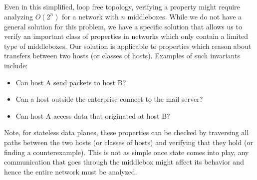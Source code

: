 {Even in this simplified, loop free topology, verifying a property might require analyzing $O(2^n)$ for a network with $n$ middleboxes.
While we do not have a general solution for this problem, we have a specific solution that allows us to verify an important class of properties in networks which
only contain a limited type of middleboxes.
Our solution is applicable to properties which reason about transfers between two hosts (or classes of hosts). Examples of such invariants include:
\begin{itemize}
\item Can host A send packets to host B?
\item Can a host outside the enterprise connect to the mail server?
\item Can host A access data that originated at host B?
\end{itemize}
Note, for stateless data planes, these properties can be checked by traversing all paths between the two hosts (or classes of hosts) and verifying that they hold
(or finding a counterexample). This is not as simple once state comes into play, any communication that goes through the middlebox might affect its behavior and
hence the entire network must be analyzed.
}
